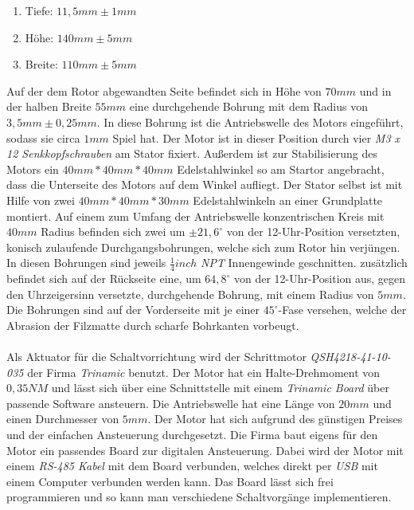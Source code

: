 \begin{enumerate}
	\item Tiefe: \(11,5 mm \pm 1 mm\)
	\item H\"{o}he: \(140 mm \pm 5mm\)
	\item Breite: \(110 mm \pm 5 mm\)
\end{enumerate}
Auf der dem Rotor abgewandten Seite befindet sich in H\"{o}he von \(70 mm\) und in der halben Breite \(55 mm\) eine durchgehende Bohrung mit dem Radius von \(3,5 mm \pm 0,25 mm\). In diese Bohrung ist die Antriebswelle des Motors eingef\"{u}hrt, sodass sie circa \(1 mm\) Spiel hat. Der Motor ist in dieser Position durch vier \textit{M3 x 12 Senkkopfschrauben} am Stator fixiert. Au{\ss}erdem ist zur Stabilisierung des Motors ein \( 40mm * 40 mm * 40 mm\) Edelstahlwinkel so am Startor angebracht, dass die Unterseite des Motors auf dem Winkel aufliegt. Der Stator selbst ist mit Hilfe von zwei \(40mm * 40mm * 30mm\) Edelstahlwinkeln an einer Grundplatte montiert. Auf einem zum Umfang der Antriebswelle konzentrischen Kreis mit \(40mm\) Radius befinden sich zwei um \(\pm 21,6^\circ\) von der 12-Uhr-Position versetzten, konisch zulaufende Durchgangsbohrungen, welche sich zum Rotor hin verj\"{u}ngen. In diesen Bohrungen sind jeweils \(\frac{1}{4} inch\) \textit{NPT} Innengewinde geschnitten. zus\"{a}tzlich befindet sich auf der R\"{u}ckseite eine, um \(64,8^\circ\) von der 12-Uhr-Position aus, gegen den Uhrzeigersinn versetzte, durchgehende Bohrung, mit einem Radius von \(5mm\). Die Bohrungen sind auf der Vorderseite mit je einer \(45^\circ\)-Fase versehen, welche der Abrasion der Filzmatte durch scharfe Bohrkanten vorbeugt.
\\\\
Als Aktuator f\"{u}r die Schaltvorrichtung wird der Schrittmotor \textit{QSH4218-41-10-035} der Firma \textit{Trinamic} benutzt. Der Motor hat ein Halte-Drehmoment von \(0,35 NM\) und l\"{a}sst sich \"{u}ber eine Schnittstelle mit einem \textit{Trinamic Board} \"{u}ber passende Software ansteuern. Die Antriebswelle hat eine L\"{a}nge von \(20 mm\) und einen Durchmesser von \(5 mm\). Der Motor hat sich aufgrund des g\"{u}nstigen Preises und der einfachen Ansteuerung durchgesetzt. Die Firma baut eigens f\"{u}r den Motor ein passendes Board zur digitalen Ansteuerung. Dabei wird der Motor mit einem \textit{RS-485 Kabel} mit dem Board verbunden, welches direkt per \textit{USB} mit einem Computer verbunden werden kann. Das Board l\"{a}sst sich frei programmieren und so kann man verschiedene Schaltvorg\"{a}nge implementieren.
\\\\
